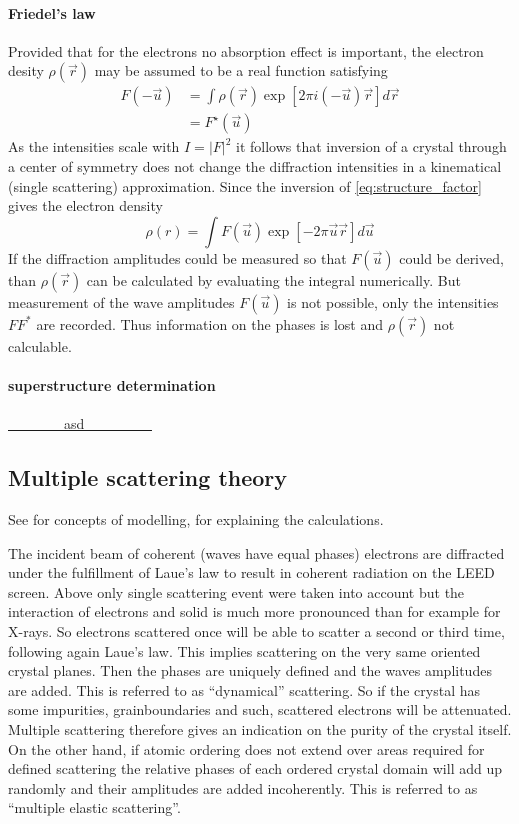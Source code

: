 \paragraph{Friedel's law}\cite[93]{cowley_diffraction_1981}
Provided that for the electrons no absorption effect is important, the electron desity $\rho(\vec r)$ may be assumed to be a real function satisfying \begin{align}
F(-\vec u) &= \int \rho(\vec r) \exp{[2\pi i(-\vec u)\vec r]} d\vec r \\                                                                                                                                                      &=F^\star(\vec u)                                                                                                                                                      \end{align}
As the intensities scale with $I=|F|^2$ it follows that inversion of a crystal through a center of symmetry does not change the diffraction intensities in a kinematical (single scattering) approximation. Since the inversion of \eqref{eq:structure_factor} gives the electron density $$\rho(r)=\int F(\vec u)\exp{[-2\pi \vec u \vec r]} d\vec u$$ If the diffraction amplitudes could be measured so that $F(\vec u)$ could be derived, than $\rho (\vec r)$ can be calculated by evaluating the integral numerically. But measurement of the wave amplitudes $F(\vec  u)$ is not possible, only the intensities $FF^*$ are recorded. Thus information on the phases is lost and $\rho(\vec r)$ not calculable.

\paragraph{superstructure determination}
\underline{\ \ \ \ \ \ \ \ asd \ \ \ \ \ \ \ \ \ }
\subsection{Multiple scattering theory}See \cite[55]{woodruff_modern_1986} for concepts of modelling, \cite{van_hove_surface_1979} for explaining the calculations.

The incident beam of coherent (waves have equal phases) electrons are diffracted under the fulfillment of Laue's law to result in coherent radiation on the LEED screen. Above only single scattering event were taken into account but the interaction of electrons and solid is much more pronounced than for example for X-rays. So electrons scattered once will be able to scatter a second or third time, following again Laue's law. This implies scattering on the very same oriented crystal planes. Then the phases are uniquely defined and the waves amplitudes are added. This is referred to as ``dynamical'' scattering. So if the crystal has some impurities, grainboundaries and such, scattered electrons will be attenuated. Multiple scattering therefore gives an indication on the purity of the crystal itself. On the other hand, if atomic ordering does not extend over areas required for defined scattering the relative phases of each ordered crystal domain will add up randomly and their amplitudes are added incoherently. This is referred to as ``multiple elastic scattering''.

